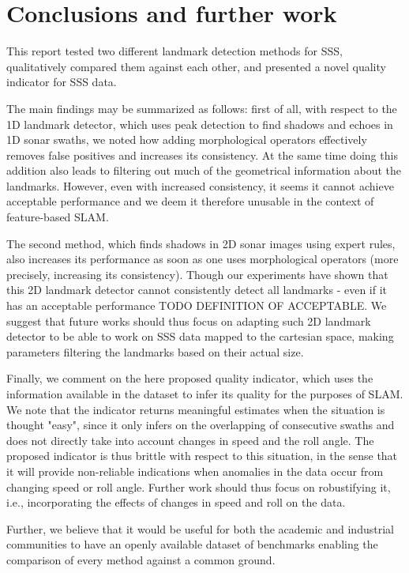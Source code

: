 \chapter{Conclusions and further work}

This report tested two different landmark detection methods for SSS, qualitatively compared them against each other, and presented a novel quality indicator for SSS data. 

The main findings may be summarized as follows: first of all, with respect to the 1D landmark detector, which uses peak detection to find shadows and echoes in 1D sonar swaths, we noted how adding morphological operators effectively removes false positives and increases its consistency. At the same time doing this addition also leads to filtering out much of the geometrical information about the landmarks. However, even with increased consistency, it seems it cannot achieve acceptable performance and we deem it therefore unusable in the context of feature-based SLAM.

The second method, which finds shadows in 2D sonar images using expert rules, also increases its performance as soon as one uses morphological operators (more precisely, increasing its consistency). Though our experiments have shown that this 2D landmark detector cannot consistently detect all landmarks - even if it has an acceptable performance TODO DEFINITION OF ACCEPTABLE. We suggest that future works should thus focus on adapting such 2D landmark detector to be able to work on SSS data mapped to the cartesian space, making parameters filtering the landmarks based on their actual size. 

Finally, we comment on the here proposed quality indicator, which uses the information available in the dataset to infer its quality for the purposes of SLAM. We note that the indicator returns meaningful estimates when the situation is thought "easy", since it only infers on the overlapping of consecutive swaths and does not directly take into account changes in speed and the roll angle. The proposed indicator is thus brittle with respect to this situation, in the sense that it will provide non-reliable indications when anomalies in the data occur from changing speed or roll angle. Further work should thus focus on robustifying it, i.e., incorporating the effects of changes in speed and roll on the data. 

Further, we believe that it would be useful for both the academic and industrial communities to have an openly available dataset of benchmarks enabling the comparison of every method against a common ground.







